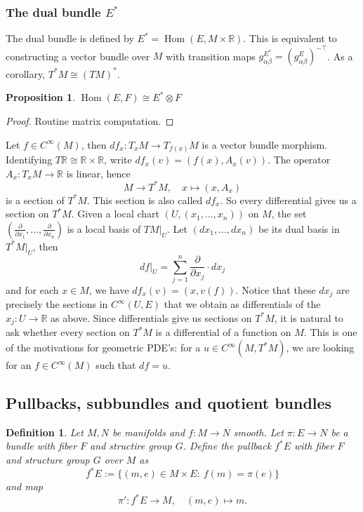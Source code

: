 \documentclass[10pt, a4paper]{article}
\newtheorem{proposition}[thm]{Proposition}
\newtheorem{defi}[thm]{Definition}
\newenvironment{noticeB}{%
  \tcolorbox[%
  notitle,
  empty,
  enhanced,  %
  breakable,
  coltext=black,
  colback=white, 
  fontupper=\rmfamily,
  noparskip,
  sharp corners,
  boxrule=-1pt,  %
  frame hidden,
  left=7pt,  %
  right=7pt,
  top=5pt,
  bottom=5pt,
  before skip=2.5ex plus 2pt,
  after skip=2.5ex plus 2pt,
  borderline west = {1.5pt}{-0.1pt}{blue!30!black}, %
  overlay unbroken and last={%
    \draw[color=black, line width=1.25pt]
    ($(frame.south west)+(1.pt, -0.1pt)$) -- ++(2em, 0);
  }
  ]}
{\endtcolorbox}
\newenvironment{definition}{\begin{noticeB}\begin{defi}}{%
    \end{defi}\end{noticeB}}
\newenvironment{noticeC}{%
  \tcolorbox[%
  notitle,
  empty,
  enhanced,  %
  breakable,
  coltext=black, 
  fontupper=\rmfamily,
  noparskip,
  sharp corners,
  boxrule=-1pt,  %
  frame hidden,
  left=7pt,  %
  right=7pt,
  top=5pt,
  bottom=5pt,
  before skip=2.5ex plus 2pt,
  after skip=2.5ex plus 2pt,
  overlay unbroken and last={%
  },
  ]}
{\endtcolorbox}
\newenvironment{myproof}%
  {\begin{noticeC}\begin{proof}}%
  {\end{proof}\end{noticeC}}
\newcommand{\R}{\mathbb {R}}
\DeclareMathOperator{\ho}{Hom}
\begin{document}
\subsubsection*{The dual bundle $E^*$}

The dual bundle is defined by $E^* = \ho (E, M \times \R)$.
This is equivalent to constructing a vector bundle over $M$ with 
transition maps $g_{\alpha \beta} ^{E^*} = (g_{\alpha \beta} ^E)^{-\top}$.
As a corollary, $T^* M \cong (TM)^*$.

\begin{proposition}
  $\ho (E, F) \cong E^* \otimes F$
\end{proposition}

\begin{myproof}
  Routine matrix computation.
\end{myproof}

Let $f \in C^\infty (M)$, then $df_x : T_x M \to T_{f(x)} M$
is a vector bundle morphism. Identifying $T \R \cong \R \times \R$,
write $df_x (v) = (f(x), A_x (v))$. The operator $A_x : T_x M \to \R$
is linear, hence 
$$M \to T^* M,\quad x \mapsto (x, A_x)$$ 
is a section of $T^* M$. This section is also called $df_x$.
So every differential gives us a section on $T^* M$.
Given a local chart $(U, (x_1, \dots, x_n))$ on $M$, the set 
$\left(\frac{\partial}{\partial x_1}, \dots, \frac{\partial}{\partial x_n}\right)$
is a local basis of $TM \big|_U$. Let 
$(d x_1, \dots, d x_n)$ be its dual basis in $T^* M\big|_U$, then 
$$df\big|_U = \sum_{j = 1} ^n \frac{\partial}{\partial x_j} \cdot dx_j$$
and for each $x \in M$, we have $df_x (v) = (x, v(f))$.
Notice that these $dx_j$ are precisely the sections in $C^\infty (U, E)$
that we obtain as differentials of the $x_j: U \to \R$ as above.
Since differentials give us sections on $T^* M$, it is natural to ask whether 
every section on $T^* M$ is a differential of a function on $M$. 
This is one of the motivations for geometric PDE's: for a $u \in C^\infty (M, T^* M)$,
we are looking for an $f \in C^\infty (M)$ such that $df = u$.

\subsection{Pullbacks, subbundles and quotient bundles}

\begin{definition}
  Let $M, N$ be manifolds and $f: M \to N$ smooth. Let $\pi: E \to N$
  be a bundle with fiber $F$ and structire group $G$.
  Define the pullback $f^* E$ with fiber $F$ and structure group $G$ over $M$ as 
  $$f^* E := \{(m, e) \in M \times E:\ f(m) = \pi (e)\}$$
  and map 
  $$\pi': f^* E \to M,\quad (m, e) \mapsto m.$$
\end{definition}
\end{document}
